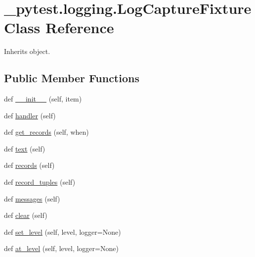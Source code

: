 \hypertarget{class__pytest_1_1logging_1_1_log_capture_fixture}{}\section{\+\_\+pytest.\+logging.\+Log\+Capture\+Fixture Class Reference}
\label{class__pytest_1_1logging_1_1_log_capture_fixture}


Inherits object.

\subsection*{Public Member Functions}
\begin{DoxyCompactItemize}
\item 
def \hyperlink{class__pytest_1_1logging_1_1_log_capture_fixture_a211edb4f72a05a77c61298917f9d1375}{\+\_\+\+\_\+init\+\_\+\+\_\+} (self, item)
\item 
def \hyperlink{class__pytest_1_1logging_1_1_log_capture_fixture_ad233a808ae98380a9eda47f4cc0a7fe0}{handler} (self)
\item 
def \hyperlink{class__pytest_1_1logging_1_1_log_capture_fixture_a48adea0085ebd2742cc9f508e65e5c9c}{get\+\_\+records} (self, when)
\item 
def \hyperlink{class__pytest_1_1logging_1_1_log_capture_fixture_a565ec737a85feaff999463f62a4863f3}{text} (self)
\item 
def \hyperlink{class__pytest_1_1logging_1_1_log_capture_fixture_a90b009f2fdf80ff95d66688fcc699471}{records} (self)
\item 
def \hyperlink{class__pytest_1_1logging_1_1_log_capture_fixture_a1b9b4a75a5b14249e040436e53dffa95}{record\+\_\+tuples} (self)
\item 
def \hyperlink{class__pytest_1_1logging_1_1_log_capture_fixture_a09facf7b01bf03f51314819d58882d2e}{messages} (self)
\item 
def \hyperlink{class__pytest_1_1logging_1_1_log_capture_fixture_afabeb49ab9e53e42cdaf70c60c249225}{clear} (self)
\item 
def \hyperlink{class__pytest_1_1logging_1_1_log_capture_fixture_aca085734a490329f84018fa43c426e7d}{set\+\_\+level} (self, level, logger=None)
\item 
def \hyperlink{class__pytest_1_1logging_1_1_log_capture_fixture_aaa1bebdc955ec8aec6298622f2931dfc}{at\+\_\+level} (self, level, logger=None)
\end{DoxyCompactItemize}


